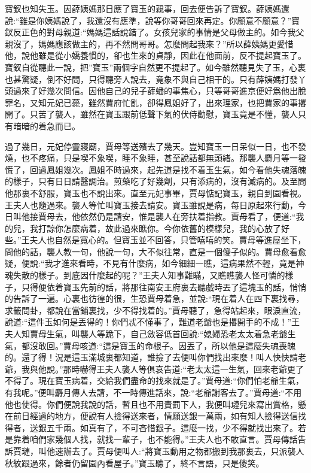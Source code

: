 \begin{parag}
    寶釵也知失玉。因薛姨媽那日應了寶玉的親事，回去便告訴了寶釵。薛姨媽還說:“雖是你姨媽說了，我還沒有應準，說等你哥哥回來再定。你願意不願意？”寶釵反正色的對母親道:“媽媽這話說錯了。女孩兒家的事情是父母做主的。如今我父親沒了，媽媽應該做主的，再不然問哥哥。怎麼問起我來？”所以薛姨媽更愛惜他，說他雖是從小嬌養慣的，卻也生來的貞靜，因此在他面前，反不提起寶玉了。寶釵自從聽此一說，把”寶玉”兩個字自然更不提起了。如今雖然聽見失了玉，心裏也甚驚疑，倒不好問，只得聽旁人說去，竟象不與自己相干的。只有薛姨媽打發丫頭過來了好幾次問信。因他自己的兒子薛蟠的事焦心，只等哥哥進京便好爲他出脫罪名，又知元妃已薨，雖然賈府忙亂，卻得鳳姐好了，出來理家，也把賈家的事撂開了。只苦了襲人，雖然在寶玉跟前低聲下氣的伏侍勸慰，寶玉竟是不懂，襲人只有暗暗的着急而已。
\end{parag}


\begin{parag}
    過了幾日，元妃停靈寢廟，賈母等送殯去了幾天。豈知寶玉一日呆似一日，也不發燒，也不疼痛，只是喫不象喫，睡不象睡，甚至說話都無頭緒。那襲人麝月等一發慌了，回過鳳姐幾次。鳳姐不時過來，起先道是找不着玉生氣，如今看他失魂落魄的樣子，只有日日請醫調治。煎藥吃了好幾劑，只有添病的，沒有減病的。及至問他那裏不舒服，寶玉也不說出來。直至元妃事畢，賈母惦記寶玉，親自到園看視。王夫人也隨過來。襲人等忙叫寶玉接去請安。寶玉雖說是病，每日原起來行動，今日叫他接賈母去，他依然仍是請安，惟是襲人在旁扶着指教。賈母看了，便道:“我的兒，我打諒你怎麼病着，故此過來瞧你。今你依舊的模樣兒，我的心放了好些。”王夫人也自然是寬心的。但寶玉並不回答，只管嘻嘻的笑。賈母等進屋坐下，問他的話，襲人教一句，他說一句，大不似往常，直是一個傻子似的。賈母愈看愈疑，便說:“我才進來看時，不見有什麼病，如今細細一瞧，這病果然不輕，竟是神魂失散的樣子。到底因什麼起的呢？”王夫人知事難瞞，又瞧瞧襲人怪可憐的樣子，只得便依着寶玉先前的話，將那往南安王府裏去聽戲時丟了這塊玉的話，悄悄的告訴了一遍。心裏也彷徨的很，生恐賈母着急，並說:“現在着人在四下裏找尋，求籤問卦，都說在當鋪裏找，少不得找着的。”賈母聽了，急得站起來，眼淚直流，說道:“這件玉如何是丟得的！你們忒不懂事了，難道老爺也是撂開手的不成！”王夫人知賈母生氣，叫襲人等跪下，自己斂容低首回說:“媳婦恐老太太着急老爺生氣，都沒敢回。”賈母咳道:“這是寶玉的命根子。因丟了，所以他是這麼失魂喪魄的。還了得！況是這玉滿城裏都知道，誰撿了去便叫你們找出來麼！叫人快快請老爺，我與他說。”那時嚇得王夫人襲人等俱哀告道:“老太太這一生氣，回來老爺更了不得了。現在寶玉病着，交給我們盡命的找來就是了。”賈母道:“你們怕老爺生氣，有我呢。”便叫麝月傳人去請，不一時傳進話來，說:“老爺謝客去了。”賈母道:“不用他也使得。你們便說我說的話，暫且也不用責罰下人，我便叫璉兒來寫出賞格，懸在前日經過的地方，便說有人撿得送來者，情願送銀一萬兩，如有知人撿得送信找得者，送銀五千兩。如真有了，不可吝惜銀子。這麼一找，少不得就找出來了。若是靠着咱們家幾個人找，就找一輩子，也不能得。”王夫人也不敢直言。賈母傳話告訴賈璉，叫他速辦去了。賈母便叫人:“將寶玉動用之物都搬到我那裏去，只派襲人秋紋跟過來，餘者仍留園內看屋子。”寶玉聽了，終不言語，只是傻笑。
\end{parag}


